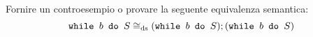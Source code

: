 {
  Fornire un controesempio o provare la seguente equivalenza semantica:
  $$
  \wbS{b}{S} \eqDS (\wbS{b}{S});(\wbS{b}{S})
  $$
}
{}
